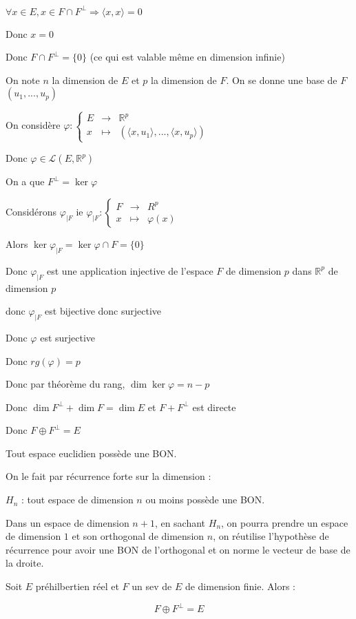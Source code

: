 \documentclass[a4paper,12pt]{book}
\newcommand{\Thr}[2]{\begin{tcolorbox}[sharp corners, colback=white,colframe=red!90!black!75, title=Théorème : #1]#2\end{tcolorbox}}
\newcommand{\Prop}[2]{\begin{tcolorbox}[sharp corners, colback=white,colframe=red!90!black!75, title=Proposition : #1]#2\end{tcolorbox}}
\newcommand{\Pre}[1]{\begin{tcolorbox}[sharp corners, colback=white,colframe=green!60!green!30!black!75, title=Preuve]#1\end{tcolorbox}}
\def\R{\mathbb{R}}
\begin{document}
\Pre{$\forall x\in E, x\in F\cap F^\perp \Rightarrow \langle x,x\rangle = 0$
\par Donc $x=0$
\par Donc $F\cap F^\perp = \{0\}$ (ce qui est valable même en dimension infinie)
\par On note $n$ la dimension de $E$ et $p$ la dimension de $F$. On se donne une base de $F$ $(u_1,..., u_p)$
\par On considère $\varphi : \left\{\begin{array}{rcl} E & \to & \R^p \\ x & \mapsto & (\langle x, u_1\rangle, ..., \langle x, u_p\rangle)\end{array}\right.$
\par Donc $\varphi\in\mathcal{L}(E, \R^p)$
\par On a que $F^\perp = \ker\varphi$
\par Considérons $\varphi_{|F}$ ie $\varphi_{|F}:\left\{\begin{array}{rcl} F & \to & R^p \\ x& \mapsto & \varphi(x)\end{array}\right.$
\par Alors $\ker\varphi_{|F} = \ker\varphi\cap F  =\{0\}$
\par Donc $\varphi_{|F}$ est une application injective de l'espace $F$ de dimension $p$ dans $\R^p$ de dimension $p$
\par donc $\varphi_{|F}$ est bijective donc surjective
\par Donc $\varphi$ est surjective
\par Donc $rg(\varphi) = p$
\par Donc par théorème du rang, $\dim\ker\varphi = n-p$
\par Donc $\dim F^\perp + \dim F = \dim E$ et $F+F^\perp$ est directe
\par Donc $F\oplus F^\perp = E$}
\Prop{Corollaire}{Tout espace euclidien possède une BON.}
\Pre{On le fait par récurrence forte sur la dimension :
\par $H_n$ : tout espace de dimension $n$ ou moins possède une BON.
\par Dans un espace de dimension $n+1$, en sachant $H_n$, on pourra prendre un espace de dimension $1$ et son orthogonal de dimension $n$, on réutilise l'hypothèse de récurrence pour avoir une BON de l'orthogonal et on norme le vecteur de base de la droite.}
\Thr{Extension}{Soit $E$ préhilbertien réel et $F$ un sev de $E$ de dimension finie. Alors :
\par $$F\oplus F^\perp = E$$}
\end{document}
